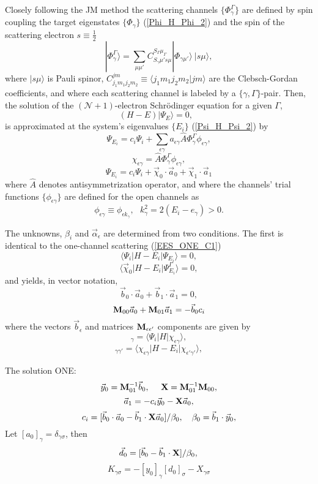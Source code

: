 \documentclass[aip
, pra
, showpacs
, aps
, twocolumn
, groupedaddress
, floatfix
]{revtex4}
\newcommand{\beq}{\begin{equation}}
\newcommand{\eeq}{\end{equation}}
\begin{document}
Closely following the JM method \cite{BR76p1491, KFB11} the scattering channels $\{\Phi_\gamma^\Gamma\}$ are defined by spin coupling the target eigenstates
$\{\Phi_\gamma\}$ (\ref{Phi_H_Phi_2})
and the spin of the scattering electron
$s\equiv \frac{1}{2}$
\beq
| \Phi_{\gamma}^{\Gamma} \rangle = \sum_{\mu \mu'}
C_{S_\gamma \mu' s \mu}^{S_\Gamma \mu_\Gamma}
|\Phi_{\gamma \mu'} \rangle \ |s \mu  \rangle,
\label{chi_phi_Gamma} \eeq
where $|s \mu \rangle$ is Pauli spinor,
$C_{j_1m_1j_2m_2}^{jm} \equiv \langle j_1m_1 j_2 m_2| jm\rangle$ are the Clebsch-Gordan coefficients,
and where each scattering channel is labeled by a $\{\gamma, \Gamma\}$-pair.
Then, the solution of the $(\mathcal{N}+1)$-electron Schr\"odinger equation for a given $\Gamma$,
\beq
(H-E) | \Psi_E \rangle =0,  \ \ \  \label{H_E_Psi_E_2}
\eeq
is approximated at the system's eigenvalues $\{E_i\}$ (\ref{Psi_H_Psi_2}) by
\beq
 \Psi_{E_i}  =  c_i \Psi_i
+ \sum_{\epsilon \gamma}   a_{\epsilon \gamma}
\hat{A} \Phi^\Gamma_{\gamma}  \phi_{\epsilon \gamma} ,
\eeq
\beq
\chi_{\epsilon \gamma} = \hat{A} \Phi^\Gamma_{\gamma}  \phi_{\epsilon \gamma},
\eeq
\beq
 \Psi_{E_i}  =  c_i \Psi_i
+ \vec{\chi}_0 \cdot \vec{a}_0   + \vec{\chi}_1 \cdot \vec{a}_1
\eeq
where $\hat{A}$ denotes antisymmetrization operator,
and where the channels' trial functions $\{ \phi_{\epsilon \gamma} \}$ are defined for the open channels as
\beq
\phi_{\epsilon \gamma}\equiv \phi_{\epsilon k_\gamma}, \ \ \   k_{\gamma}^2 = 2(E_i - e_\gamma) > 0.
\eeq


The unknowns, $\beta_i$ and $\vec{\alpha}_\epsilon$ are determined from two conditions. The first is identical to the one-channel scattering (\ref{EES_ONE_C1})
\beq
\langle\Psi_i|H-E_i|\Psi_{E_i}\rangle=0,
\label{EES_MC_C1} \eeq  %
\beq
\langle \vec{\chi}_{0} |H-E_i|\Psi_{E_i}^{\Gamma}\rangle=0,
\label{EES_MC_C2} \eeq  %
and yields, in vector notation,
\beq
\vec{b}_0 \cdot \vec{a}_0 + \vec{b}_1 \cdot \vec{a}_1 = 0, \label{CK_s}
\eeq
\beq
{\bf M}_{00} \vec{a}_0 + {\bf M}_{01} \vec{a}_1 = -  \vec{b}_0 c_i
\eeq
where the vectors $\vec{b}_\epsilon$ and matrices ${\bf M}_{\epsilon\epsilon'}$ components are given by
\beq
[b_{\epsilon}]_{\gamma}
= \langle \Psi_i |H| \chi_{\epsilon \gamma} \rangle,
\eeq
\beq
[M_{\epsilon \epsilon'}]_{\gamma \gamma'} = \langle \chi_{\epsilon \gamma}  | H-E_i |
\chi_{\epsilon' \gamma'} \rangle,
\label{Y_B_W} \eeq


The solution ONE:
\beq
\vec{y}_0 = {\bf M}_{01}^{-1} \vec{b}_0, \ \ \ \
{\bf X} = {\bf M}_{01}^{-1} {\bf M}_{00},
\eeq
\beq
\vec{a}_1= - c_i \vec{y}_0   - {\bf X} \vec{a}_0,
\eeq
\beq
c_i = [ \vec{b}_0 \cdot \vec{a}_0
- \vec{b}_1 \cdot {\bf X} \vec{a}_0 ]  / \beta_0 ,\ \ \
\beta_0 = \vec{b}_1 \cdot  \vec{y}_0,
\eeq
Let $[a_0]_\gamma = \delta_{\gamma \sigma}$, then
\beq
\vec{d}_0 = [ \vec{b}_0
- \vec{b}_1 \cdot {\bf X} ]  / \beta_0 ,\\
\eeq
\beq
K_{\gamma \sigma}= - [y_0]_\gamma [d_0]_\sigma   - X_{\gamma \sigma}
\eeq
\end{document}

